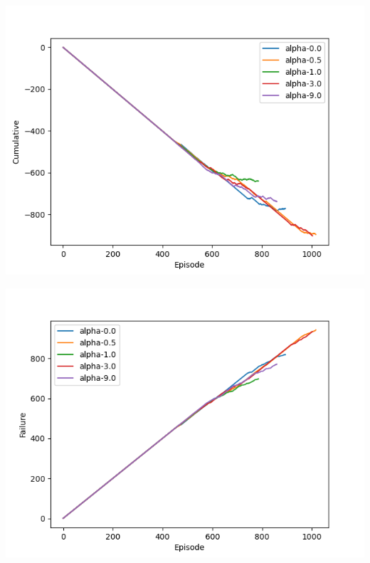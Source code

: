     \begin{minipage}{.5\textwidth}
        \centering
          \includegraphics[width=1.1\linewidth]{figures/cumulative-intermediate.png}
          \label{fig:cumulativeminimal}
      \end{minipage} %
      \begin{minipage}{.5\textwidth}
          \centering
          \includegraphics[width=1.1\linewidth]{figures/failures-intermediate.png}
          \label{fig:failuresminimal}
      \end{minipage} %
      
